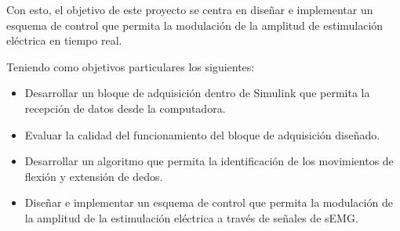 Con esto, el objetivo de este proyecto se centra en diseñar e implementar un esquema de control que permita la modulación de la amplitud de estimulación eléctrica en tiempo real.

Teniendo como objetivos particulares los siguientes:

\begin{itemize}
	\item Desarrollar un bloque de adquisición dentro de Simulink que permita la recepción de datos desde la computadora.
	\item Evaluar la calidad del funcionamiento del bloque de adquisición diseñado.
	\item Desarrollar un algoritmo que permita la identificación de los movimientos de flexión y extensión de dedos.
	\item Diseñar e implementar un esquema de control que permita la modulación de la amplitud de la estimulación eléctrica a través de señales de sEMG.
\end{itemize}
